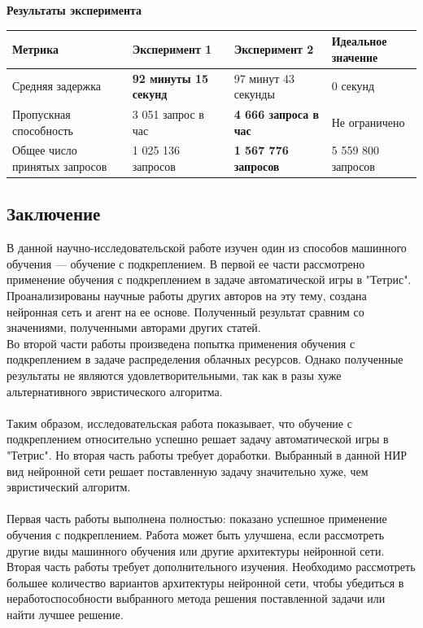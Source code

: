 \documentclass{article}
\begin{document}
\textbf{Результаты эксперимента}\\
\begin{tabular}{ | l | l | l | l | }
\hline
Метрика & Эксперимент 1 & Эксперимент 2 & Идеальное значение\\ \hline
Средняя задержка & \textbf{92 минуты 15 секунд} & 97 минут 43 секунды & 0 секунд \\
Пропускная способность & 3 051 запрос в час & \textbf{4 666 запроса в час} & Не ограничено \\
Общее число принятых запросов & 1 025 136 запросов & \textbf{1 567 776 запросов} & 5 559 800 запросов \\
\hline
\end{tabular}
\begin{center}
\section {Заключение}
\end{center}
В данной научно-исследовательской работе изучен один из способов машинного обучения — обучение с подкреплением. В первой ее части рассмотрено применение обучения с подкреплением в задаче автоматической игры в "Тетрис". Проанализированы научные работы других авторов на эту тему, создана нейронная сеть и агент на ее основе. Полученный результат сравним со значениями, полученными авторами других статей.\\
Во второй части работы произведена попытка применения обучения с подкреплением в задаче распределения облачных ресурсов. Однако полученные результаты не являются удовлетворительными, так как в разы хуже альтернативного эвристического алгоритма.\\
~\\
Таким образом, исследовательская работа показывает, что обучение с подкреплением относительно успешно решает задачу автоматической игры в "Тетрис". Но вторая часть работы требует доработки. Выбранный в данной НИР вид нейронной сети решает поставленную задачу значительно хуже, чем эвристический алгоритм.\\
~\\
Первая часть работы выполнена полностью: показано успешное применение обучения с подкреплением. Работа может быть улучшена, если рассмотреть другие виды машинного обучения или другие архитектуры нейронной сети. Вторая часть работы требует дополнительного изучения. Необходимо рассмотреть большее количество вариантов архитектуры нейронной сети, чтобы убедиться в неработоспособности выбранного метода решения поставленной задачи или найти лучшее решение.\\
\end{document}
